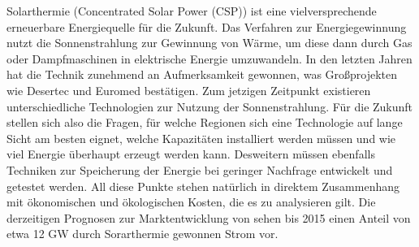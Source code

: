 Solarthermie (Concentrated Solar Power (CSP)) ist eine vielversprechende erneuerbare Energiequelle für die Zukunft. Das Verfahren zur Energiegewinnung nutzt die Sonnenstrahlung zur Gewinnung von Wärme, um diese dann durch Gas oder Dampfmaschinen in elektrische Energie umzuwandeln. In den letzten Jahren hat die Technik zunehmend an Aufmerksamkeit gewonnen, was Großprojekten wie Desertec und Euromed bestätigen. Zum jetzigen Zeitpunkt existieren unterschiedliche Technologien zur Nutzung der Sonnenstrahlung. Für die Zukunft stellen sich also die Fragen, für welche Regionen sich eine Technologie auf lange Sicht am besten eignet, welche Kapazitäten installiert werden müssen und wie viel Energie überhaupt erzeugt werden kann. Desweitern müssen ebenfalls Techniken zur Speicherung der Energie bei geringer Nachfrage entwickelt und getestet werden. All diese Punkte stehen natürlich in direktem Zusammenhang mit ökonomischen und ökologischen Kosten, die es zu analysieren gilt. Die derzeitigen Prognosen zur Marktentwicklung von sehen bis 2015 einen Anteil von etwa 12 GW durch Sorarthermie gewonnen Strom vor.
